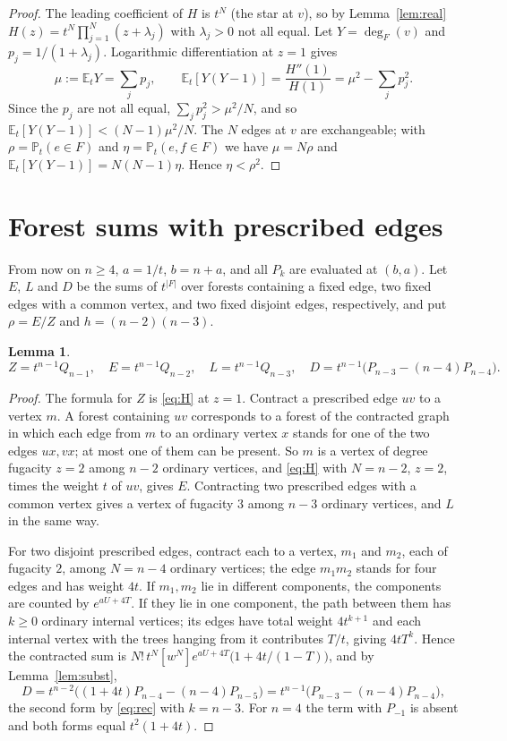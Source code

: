 \documentclass[11pt]{amsart}
\newtheorem{lemma}[theorem]{Lemma}
\theoremstyle{remark}
\newcommand{\Pt}{\mathbb{P}_t}
\newcommand{\Et}{\mathbb{E}_t}
\begin{document}
\begin{proof}
The leading coefficient of $H$ is $t^N$ (the star at $v$), so by Lemma~\ref{lem:real}
$H(z)=t^N\prod_{j=1}^N(z+\lambda_j)$ with $\lambda_j>0$ not all equal. Let
$Y=\deg_F(v)$ and $p_j=1/(1+\lambda_j)$. Logarithmic differentiation at $z=1$ gives
\[
\mu:=\Et Y=\sum_jp_j,\qquad \Et[Y(Y-1)]=\frac{H''(1)}{H(1)}=\mu^2-\sum_jp_j^2 .
\]
Since the $p_j$ are not all equal, $\sum_jp_j^2>\mu^2/N$, and so
$\Et[Y(Y-1)]<(N-1)\mu^2/N$. The $N$ edges at $v$ are exchangeable; with
$\rho=\Pt(e\in F)$ and $\eta=\Pt(e,f\in F)$ we have $\mu=N\rho$ and
$\Et[Y(Y-1)]=N(N-1)\eta$. Hence $\eta<\rho^2$.
\end{proof}

\section{Forest sums with prescribed edges}\label{sec:counts}

From now on $n\ge4$, $a=1/t$, $b=n+a$, and all $P_k$ are evaluated at $(b,a)$. Let $E$,
$L$ and $D$ be the sums of $t^{|F|}$ over forests containing a fixed edge, two fixed
edges with a common vertex, and two fixed disjoint edges, respectively, and put
$\rho=E/Z$ and $h=(n-2)(n-3)$.

\begin{lemma}\label{lem:counts}
\[
Z=t^{n-1}Q_{n-1},\quad E=t^{n-1}Q_{n-2},\quad L=t^{n-1}Q_{n-3},\quad
D=t^{n-1}\bigl(P_{n-3}-(n-4)P_{n-4}\bigr).
\]
\end{lemma}

\begin{proof}
The formula for $Z$ is \eqref{eq:H} at $z=1$. Contract a prescribed edge $uv$ to a
vertex $m$. A forest containing $uv$ corresponds to a forest of the contracted graph in
which each edge from $m$ to an ordinary vertex $x$ stands for one of the two edges
$ux,vx$; at most one of them can be present. So $m$ is a vertex of degree fugacity
$z=2$ among $n-2$ ordinary vertices, and \eqref{eq:H} with $N=n-2$, $z=2$, times the
weight $t$ of $uv$, gives $E$. Contracting two prescribed edges with a common vertex
gives a vertex of fugacity $3$ among $n-3$ ordinary vertices, and $L$ in the same way.

For two disjoint prescribed edges, contract each to a vertex, $m_1$ and $m_2$, each of
fugacity $2$, among $N=n-4$ ordinary vertices; the edge $m_1m_2$ stands for four edges
and has weight $4t$. If $m_1,m_2$ lie in different components, the components are
counted by $e^{aU+4T}$. If they lie in one component, the path between them has
$k\ge0$ ordinary internal vertices; its edges have total weight $4t^{k+1}$ and each
internal vertex with the trees hanging from it contributes $T/t$, giving $4tT^k$. Hence
the contracted sum is $N!\,t^N[w^N]e^{aU+4T}\bigl(1+4t/(1-T)\bigr)$, and by
Lemma~\ref{lem:subst},
\[
D=t^{n-2}\bigl((1+4t)P_{n-4}-(n-4)P_{n-5}\bigr)=t^{n-1}\bigl(P_{n-3}-(n-4)P_{n-4}\bigr),
\]
the second form by \eqref{eq:rec} with $k=n-3$. For $n=4$ the term with $P_{-1}$ is
absent and both forms equal $t^2(1+4t)$.
\end{proof}
\end{document}
